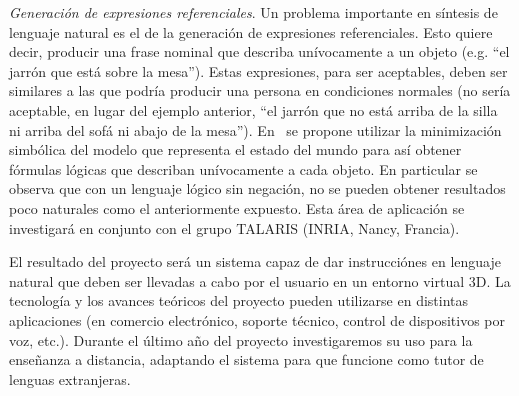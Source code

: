%
%
%
%
%
%
%
%
%

\emph{Generaci\'on de expresiones referenciales}. Un problema importante en
s\'intesis de lenguaje natural es el de la generaci\'on de expresiones
referenciales. Esto quiere decir, producir una frase nominal que describa
un\'ivocamente a un objeto (e.g. ``el jarr\'on que est\'a sobre la mesa'').
Estas expresiones, para ser aceptables, deben ser similares a las que podr\'ia
producir una persona en condiciones normales (no ser\'ia aceptable, en lugar del
ejemplo anterior, ``el jarr\'on que no est\'a arriba de la silla ni arriba del
sof\'a ni abajo de la mesa'').  En~\cite{AKS08} se propone utilizar la
minimizaci\'on simb\'olica del modelo que representa
el estado del mundo para as\'i obtener f\'ormulas l\'ogicas que describan
un\'ivocamente a cada objeto. En particular se observa que con un
lenguaje l\'ogico sin negaci\'on, no se pueden obtener resultados poco
naturales como el anteriormente expuesto. Esta \'area de aplicaci\'on se
investigar\'a en conjunto con el grupo TALARIS (INRIA,
Nancy, Francia).


El resultado del proyecto ser\'a un sistema capaz de dar instrucci\'ones
en lenguaje natural que deben ser llevadas a cabo por el usuario en un
entorno virtual 3D.  La tecnolog\'ia y los avances te\'oricos del proyecto
pueden utilizarse en distintas aplicaciones (en comercio electr\'onico,
soporte t\'ecnico, control de dispositivos por voz, etc.).  Durante el
\'ultimo a\~no del proyecto investigaremos su uso para la ense\~nanza a
distancia, adaptando el sistema para que funcione como tutor de lenguas
extranjeras.

